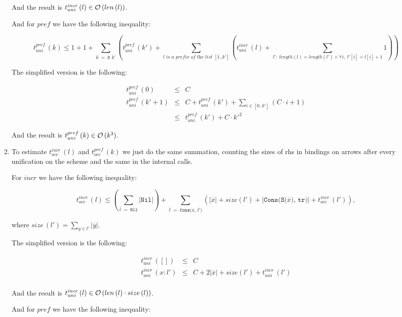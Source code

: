 \begin{enumerate}
And the result is $t_{uni}^{incr}\,(l) \in \mathcal{O}\,(len\,(l))$.

And for $pref$ we have the following inequality:

  \[
    t_{uni}^{pref}\,(k) \le 1 + 1 + \displaystyle\sum\limits_{\overline{k} \;=\; \texttt{S $\overline{k'}$}} (t_{uni}^{pref}\,(k') + \displaystyle\sum\limits_{\textit{$l$ is a prefix of the list $[1..k']$}} (t_{uni}^{incr}\,(l) + \displaystyle\sum\limits_{l': \; length(l) = length(l') \land \forall i, \; l'[i] = l[i] + 1} 1))
    \]

The simplified version is the following:

\[ \begin{array}{rcl}
t_{uni}^{pref}\,(0) &\le& C \\
t_{uni}^{pref}\,(k' + 1) &\le& C + t_{uni}^{pref}\,(k') + \displaystyle\sum\limits_{i \in [0..k']} (C \cdot i + 1) \\
&\le& t_{uni}^{pref}\,(k') + C \cdot k'^2
\end{array} \]

And the result is $t_{uni}^{pref}\,(k) \in \mathcal{O}\,(k^3)$.

\item To estimate $t_{occ}^{incr}\,(l)$ and $t_{occ}^{pref}\,(k)$ we just do the same summation, counting the sizes of rhs in bindings on arrows after every unification on the scheme and the same in the internal calls.

For $incr$ we have the following inequality:

\[ t_{occ}^{incr}\,(l) \le (\displaystyle\sum\limits_{\overline{l} \;=\; \texttt{Nil}} |\texttt{Nil}|) + \displaystyle\sum\limits_{\overline{l} \;=\; \texttt{Cons($\overline{x}$, $\overline{l'}$)}} (|\overline{x}| + size(l') + |\texttt{Cons(S($\overline{x}$), tr)}| + t_{occ}^{incr}\,(l') ), \]

where $size\,(l') = \displaystyle\sum\limits_{y \in l'} |\overline{y}|$.

The simplified version is the following:

\[ \begin{array}{lcl}
t_{uni}^{incr}\,([]) &\le& C \\
t_{uni}^{incr}\,(x : l') &\le& C + 2 |\overline{x}| + size(l') + t_{uni}^{incr}\,(l') \\
\end{array} \]

And the result is $t_{uni}^{incr}\,(l) \in \mathcal{O}\,(len\,(l) \cdot size\,(l))$.

And for $pref$ we have the following inequality:


\end{enumerate}
